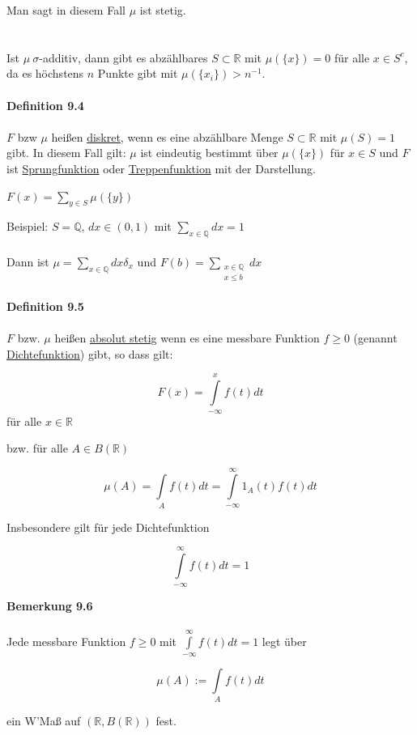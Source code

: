 \documentclass[10pt,a4paper]{report}
\newcommand{\R}{\mathbb{R}}
\numberwithin{equation}{section}
\numberwithin{figure}{section}
\theoremstyle{plain}
\theoremstyle{definition}
\theoremstyle{plain}
\theoremstyle{definition}
\theoremstyle{remark}
\theoremstyle{plain}
\begin{document}
Man sagt in diesem Fall $\mu$ ist stetig.\\\\\\
Ist $\mu~ \sigma$-additiv, dann gibt es abzählbares $S \subset \R$ mit $\mu(\{x\})=0$ für alle $x \in S^c$, da es höchstens $n$ Punkte gibt mit $\mu(\{x_i\})>n^{-1}$. \\\\
\textbf{Definition 9.4}\\\\
$F$ bzw $\mu$ heißen \underline{diskret}, wenn es eine abzählbare Menge $S \subset \R$ mit $\mu(S)=1$ gibt. In diesem Fall gilt: $\mu$ ist eindeutig bestimmt über $\mu(\{x\})$ für $x \in S$ und $F$ ist \underline{Sprungfunktion} oder \underline{Treppenfunktion} mit der Darstellung.
\begin{center}
$F(x)=\sum\limits_{y \in S} \mu(\{y\})$
\end{center}  
Beispiel:
$S=\mathbb{Q}$, $dx \in (0,1)$ mit $\sum\limits_{x \in \mathbb{Q}} dx=1$\\\\
Dann ist $\mu=\sum\limits_{x \in \mathbb{Q} }dx\delta_x$ und $F(b)=\sum\limits_{\substack{x \in \mathbb{Q}\\ x \leq b}} dx$\\\\
\textbf{Definition 9.5}\\\\
$F$ bzw. $\mu$ heißen \underline{absolut stetig} wenn es eine messbare Funktion $f\geq 0$ (genannt \underline{Dichtefunktion}) gibt, so dass gilt:
\begin{center}
\[F(x)=\int\limits_{-\infty}^xf(t)dt\] für alle $x \in \R$
\end{center}
bzw. für alle $A \in B(\R)$
\begin{center}
\[\mu(A)=\int\limits_A f(t) dt=\int\limits_{-\infty}^\infty 1_A(t)f(t)dt\]
\end{center}
Insbesondere gilt für jede Dichtefunktion
\begin{center}
\[\int\limits_{-\infty}^\infty f(t)dt=1\]
\end{center}
\textbf{Bemerkung 9.6}\\\\
Jede messbare Funktion $f \geq 0$ mit $\int\limits_{-\infty}^\infty f(t)dt=1$ legt über 
\begin{center}
\[\mu(A):=\int\limits_Af(t)dt\]
\end{center}
ein W'Maß auf $(\R,B(\R))$ fest.\\\\
\end{document}
